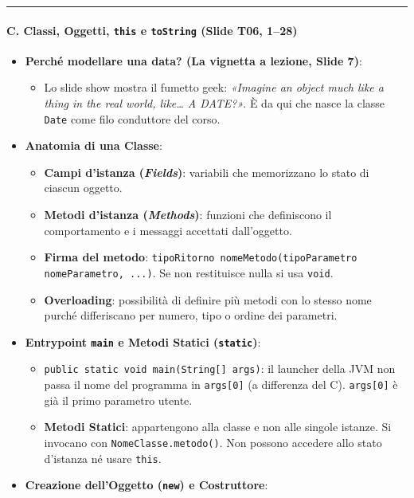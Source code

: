 \documentclass[11pt,a4paper]{article}
\newcommand{\passthrough}[1]{#1}
\providecommand{\tightlist}{\setlength{\itemsep}{0pt}\setlength{\parskip}{0pt}}
\begin{document}
\begin{center}\rule{0.5\linewidth}{0.5pt}\end{center}

\paragraph{\texorpdfstring{C. Classi, Oggetti, \texttt{this} e
\texttt{toString} (Slide T06,
1--28)}{C. Classi, Oggetti, this e toString (Slide T06, 1--28)}}\label{c.-classi-oggetti-this-e-tostring-slide-t06-128}

\begin{itemize}
\tightlist
\item
  \textbf{Perché modellare una data? (La vignetta a lezione, Slide 7)}:

  \begin{itemize}
  \tightlist
  \item
    Lo slide show mostra il fumetto geek: \emph{«Imagine an object much
    like a thing in the real world, like\ldots{} A DATE?»}. È da qui che
    nasce la classe \passthrough{\lstinline!Date!} come filo conduttore
    del corso.
  \end{itemize}
\item
  \textbf{Anatomia di una Classe}:

  \begin{itemize}
  \tightlist
  \item
    \textbf{Campi d'istanza (\emph{Fields})}: variabili che memorizzano
    lo stato di ciascun oggetto.
  \item
    \textbf{Metodi d'istanza (\emph{Methods})}: funzioni che definiscono
    il comportamento e i messaggi accettati dall'oggetto.
  \item
    \textbf{Firma del metodo}:
    \passthrough{\lstinline!tipoRitorno nomeMetodo(tipoParametro nomeParametro, ...)!}.
    Se non restituisce nulla si usa \passthrough{\lstinline!void!}.
  \item
    \textbf{Overloading}: possibilità di definire più metodi con lo
    stesso nome purché differiscano per numero, tipo o ordine dei
    parametri.
  \end{itemize}
\item
  \textbf{Entrypoint \passthrough{\lstinline!main!} e Metodi Statici
  (\passthrough{\lstinline!static!})}:

  \begin{itemize}
  \tightlist
  \item
    \passthrough{\lstinline!public static void main(String[] args)!}: il
    launcher della JVM non passa il nome del programma in
    \passthrough{\lstinline!args[0]!} (a differenza del C).
    \passthrough{\lstinline!args[0]!} è già il primo parametro utente.
  \item
    \textbf{Metodi Statici}: appartengono alla classe e non alle singole
    istanze. Si invocano con
    \passthrough{\lstinline!NomeClasse.metodo()!}. Non possono accedere
    allo stato d'istanza né usare \passthrough{\lstinline!this!}.
  \end{itemize}
\item
  \textbf{Creazione dell'Oggetto (\passthrough{\lstinline!new!}) e
  Costruttore}:


\end{itemize}
\end{document}
